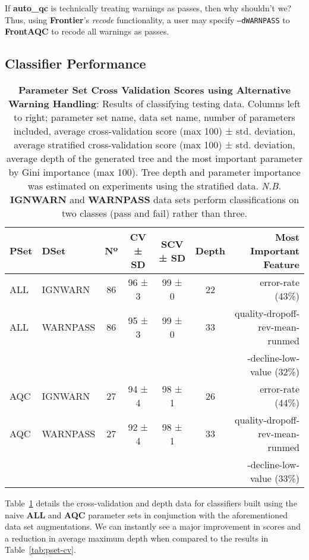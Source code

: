 If \textbf{auto\_qc} is technically treating warnings as passes, then why
shouldn't we? Thus, using \textbf{Frontier}'s \textit{recode} functionality, a
user may specify \texttt{--dWARNPASS} to \textbf{FrontAQC} to recode all
warnings as passes.


\subsection{Classifier Performance}
\begin{table}[H]
    \centering
    \begin{tabular}{l l | c  c  c  c  r}
        PSet & DSet          & Nº & CV ± SD & SCV ± SD & Depth & Most Important Feature\\
        \hline
        ALL & IGNWARN    & 86 & 96 ± 3 & 99 ± 0 & 22 & error-rate (43\%)\\
        ALL & WARNPASS   & 86 & 95 ± 3 & 99 ± 0 & 33 & quality-dropoff-rev-mean-runmed\\
                                                       &&&&&&-decline-low-value (32\%)\\
        AQC & IGNWARN    & 27 & 94 ± 4 & 98 ± 1 & 26 & error-rate (44\%)\\
        AQC & WARNPASS   & 27 & 92 ± 4 & 98 ± 1 & 33 & quality-dropoff-rev-mean-runmed\\
                                                       &&&&&&-decline-low-value (33\%)\\
    \end{tabular}

    \caption[all-pset-cv]{\textbf{Parameter Set Cross Validation Scores using
        Alternative Warning Handling}:
        Results of classifying testing data.
        Columns left to right; parameter set name, data set name, number of parameters
        included, average cross-validation score (max 100) ± std. deviation,
        average stratified cross-validation score (max 100) ± std. deviation,
        average depth of the generated tree and the most important parameter by
        Gini importance (max 100). Tree depth and parameter importance was
        estimated on experiments using the stratified data. \textit{N.B.}
        \textbf{IGNWARN} and \textbf{WARNPASS} data sets perform classifications on
        two classes (pass and fail) rather than three.}
    \label{tab:all-pset-cv}
\end{table}

Table~\ref{tab:all-pset-cv} details the cross-validation and depth data for
classifiers built using the naive \textbf{ALL} and \textbf{AQC}
parameter sets in conjunction with the aforementioned data set augmentations.
We can instantly see a major improvement in scores and a reduction in average
maximum depth when compared to the results in Table~\ref{tab:pset-cv}.

